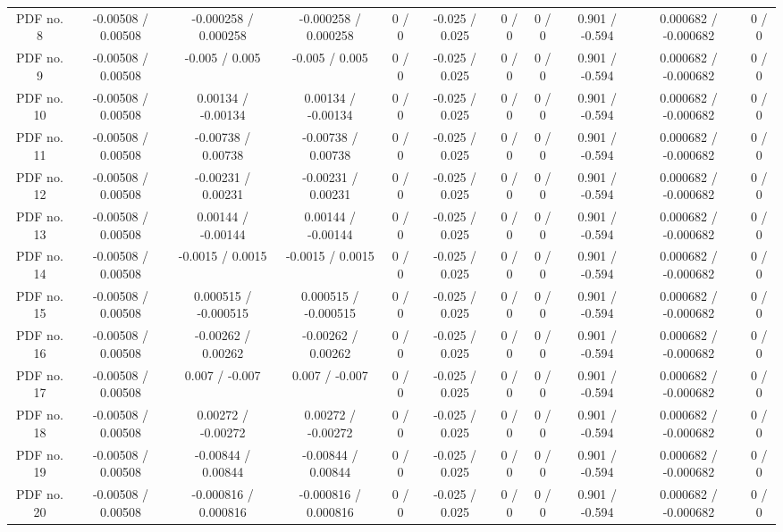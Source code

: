 \begin{table}[htbp]
\begin{center}
\begin{tabular}{|c|c|c|c|c|c|c|c|c|c|c|}
  PDF no. 8 & -0.00508 / 0.00508 & -0.000258 / 0.000258 & -0.000258 / 0.000258 & 0 / 0 & -0.025 / 0.025 & 0 / 0 & 0 / 0 & 0.901 / -0.594 & 0.000682 / -0.000682 & 0 / 0 \\ 
  PDF no. 9 & -0.00508 / 0.00508 & -0.005 / 0.005 & -0.005 / 0.005 & 0 / 0 & -0.025 / 0.025 & 0 / 0 & 0 / 0 & 0.901 / -0.594 & 0.000682 / -0.000682 & 0 / 0 \\ 
  PDF no. 10 & -0.00508 / 0.00508 & 0.00134 / -0.00134 & 0.00134 / -0.00134 & 0 / 0 & -0.025 / 0.025 & 0 / 0 & 0 / 0 & 0.901 / -0.594 & 0.000682 / -0.000682 & 0 / 0 \\ 
  PDF no. 11 & -0.00508 / 0.00508 & -0.00738 / 0.00738 & -0.00738 / 0.00738 & 0 / 0 & -0.025 / 0.025 & 0 / 0 & 0 / 0 & 0.901 / -0.594 & 0.000682 / -0.000682 & 0 / 0 \\ 
  PDF no. 12 & -0.00508 / 0.00508 & -0.00231 / 0.00231 & -0.00231 / 0.00231 & 0 / 0 & -0.025 / 0.025 & 0 / 0 & 0 / 0 & 0.901 / -0.594 & 0.000682 / -0.000682 & 0 / 0 \\ 
  PDF no. 13 & -0.00508 / 0.00508 & 0.00144 / -0.00144 & 0.00144 / -0.00144 & 0 / 0 & -0.025 / 0.025 & 0 / 0 & 0 / 0 & 0.901 / -0.594 & 0.000682 / -0.000682 & 0 / 0 \\ 
  PDF no. 14 & -0.00508 / 0.00508 & -0.0015 / 0.0015 & -0.0015 / 0.0015 & 0 / 0 & -0.025 / 0.025 & 0 / 0 & 0 / 0 & 0.901 / -0.594 & 0.000682 / -0.000682 & 0 / 0 \\ 
  PDF no. 15 & -0.00508 / 0.00508 & 0.000515 / -0.000515 & 0.000515 / -0.000515 & 0 / 0 & -0.025 / 0.025 & 0 / 0 & 0 / 0 & 0.901 / -0.594 & 0.000682 / -0.000682 & 0 / 0 \\ 
  PDF no. 16 & -0.00508 / 0.00508 & -0.00262 / 0.00262 & -0.00262 / 0.00262 & 0 / 0 & -0.025 / 0.025 & 0 / 0 & 0 / 0 & 0.901 / -0.594 & 0.000682 / -0.000682 & 0 / 0 \\ 
  PDF no. 17 & -0.00508 / 0.00508 & 0.007 / -0.007 & 0.007 / -0.007 & 0 / 0 & -0.025 / 0.025 & 0 / 0 & 0 / 0 & 0.901 / -0.594 & 0.000682 / -0.000682 & 0 / 0 \\ 
  PDF no. 18 & -0.00508 / 0.00508 & 0.00272 / -0.00272 & 0.00272 / -0.00272 & 0 / 0 & -0.025 / 0.025 & 0 / 0 & 0 / 0 & 0.901 / -0.594 & 0.000682 / -0.000682 & 0 / 0 \\ 
  PDF no. 19 & -0.00508 / 0.00508 & -0.00844 / 0.00844 & -0.00844 / 0.00844 & 0 / 0 & -0.025 / 0.025 & 0 / 0 & 0 / 0 & 0.901 / -0.594 & 0.000682 / -0.000682 & 0 / 0 \\ 
  PDF no. 20 & -0.00508 / 0.00508 & -0.000816 / 0.000816 & -0.000816 / 0.000816 & 0 / 0 & -0.025 / 0.025 & 0 / 0 & 0 / 0 & 0.901 / -0.594 & 0.000682 / -0.000682 & 0 / 0 \\ 

\end{tabular}
\end{center}
\end{table}
